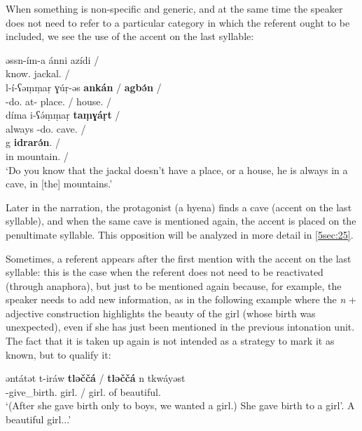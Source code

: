 \documentclass[output=paper]{langsci/langscibook}
\begin{document}
When something is non-specific and generic, and at the same time the speaker does not need to refer to a particular category in which the referent ought to be included, we see the use of the accent on the last syllable:

\begin{exe}
\ex\label{5ex:11}
\gll	əssn-ím-a	ánni	azídi	/ \\
	know.{}	{}	jackal.{}	/ \\
\glt
\exi{}
\gll	l-í-ʕəṃṃaṛ	ɣúṛ-əs	{\bf{ankán}}	/	{\bf{agbə́n}}	/ \\
	{}-do.{}	at-{}	place.{}	/	house.{}	/ \\
\glt
\exi{}
\gll	díma	i-ʕə́ṃṃaṛ	{\bf{taṃɣáṛt}}	/ \\
	always	{}-do.{}	cave.{}	/ \\
\glt
\exi{}
\gll	g	{\bf{idrarə́n}}.	/ \\
	in	mountain.{}	/ \\
\glt	`Do you know that the jackal doesn't have a place, or a house, he is always in a cave, in [the] mountains.'
\end{exe}

{
Later in the narration, the protagonist (a hyena) finds a cave (accent on the last syllable), and when the same cave is mentioned again, the accent is placed on the penultimate syllable. This opposition will be analyzed in more detail in \ref{5sec:25}.
}

Sometimes, a referent appears after the first mention with the accent on the last syllable: this is the case when the referent does not need to be reactivated (through anaphora), but just to be mentioned again because, for example, the speaker needs to add new information, as in the following example where the {\emph{n}} + adjective construction highlights the beauty of the girl (whose birth was unexpected), even if she has just been mentioned in the previous intonation unit. The fact that it is taken up again is not intended as a strategy to mark it as known, but to qualify it:

\begin{exe}
\ex\label{5ex:12}
\gll	əntátət	t-iráw	{\bf{tləččá}}	/  {\bf{tləččá}}	n	tkwáyəst \\
	{}	{}-give\_birth.{}	girl.{}	/  girl.{}	of	beautiful.{} \\
\glt	`(After she gave birth only to boys, we wanted a girl.) She gave birth to a girl'. A beautiful girl...'
\end{exe}
\end{document}
